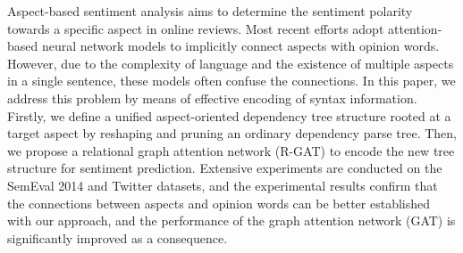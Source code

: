 Aspect-based sentiment analysis aims to determine the sentiment polarity towards a specific aspect in online reviews. Most recent efforts adopt attention-based neural network models to implicitly connect aspects with opinion words. However, due to the complexity of language and the existence of multiple aspects in a single sentence, these models often confuse the connections. In this paper, we address this problem by means of effective encoding of syntax information. Firstly, we define a unified aspect-oriented dependency tree structure rooted at a target aspect by reshaping and pruning an ordinary dependency parse tree. Then, we propose a relational graph attention network (R-GAT) to encode the new tree structure for sentiment prediction. Extensive experiments are conducted on the SemEval 2014 and Twitter datasets, and the experimental results confirm that the connections between aspects and opinion words can be better established with our approach, and the performance of the graph attention network (GAT) is significantly improved as a consequence.
